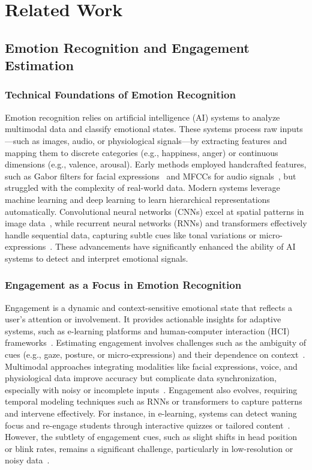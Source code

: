 \section{Related Work}
\subsection{Emotion Recognition and Engagement Estimation}
\subsubsection{Technical Foundations of Emotion Recognition}
Emotion recognition relies on artificial intelligence (AI) systems to analyze multimodal data and classify emotional states. These systems process raw inputs—such as images, audio, or physiological signals—by extracting features and mapping them to discrete categories (e.g., happiness, anger) or continuous dimensions (e.g., valence, arousal). Early methods employed handcrafted features, such as Gabor filters for facial expressions~\cite{barbu2010gabor} and MFCCs for audio signals~\cite{ali2020mel}, but struggled with the complexity of real-world data. 
Modern systems leverage machine learning and deep learning to learn hierarchical representations automatically. Convolutional neural networks (CNNs) excel at spatial patterns in image data~\cite{debnath2022four}, while recurrent neural networks (RNNs) and transformers effectively handle sequential data, capturing subtle cues like tonal variations or micro-expressions~\cite{lim2016speech, wang2023deep}. These advancements have significantly enhanced the ability of AI systems to detect and interpret emotional signals.

\subsubsection{Engagement as a Focus in Emotion Recognition}
Engagement is a dynamic and context-sensitive emotional state that reflects a user’s attention or involvement. It provides actionable insights for adaptive systems, such as e-learning platforms and human-computer interaction (HCI) frameworks~\cite{d2013autotutor, bosch2015automatic}. 
Estimating engagement involves challenges such as the ambiguity of cues (e.g., gaze, posture, or micro-expressions) and their dependence on context~\cite{markus2014culture}. Multimodal approaches integrating modalities like facial expressions, voice, and physiological data improve accuracy but complicate data synchronization, especially with noisy or incomplete inputs~\cite{zeng2007survey, vairamani2024advancements}.
Engagement also evolves, requiring temporal modeling techniques such as RNNs or transformers to capture patterns and intervene effectively. For instance, in e-learning, systems can detect waning focus and re-engage students through interactive quizzes or tailored content~\cite{karaoglan2022learning}. However, the subtlety of engagement cues, such as slight shifts in head position or blink rates, remains a significant challenge, particularly in low-resolution or noisy data~\cite{oertel2021towards}.

